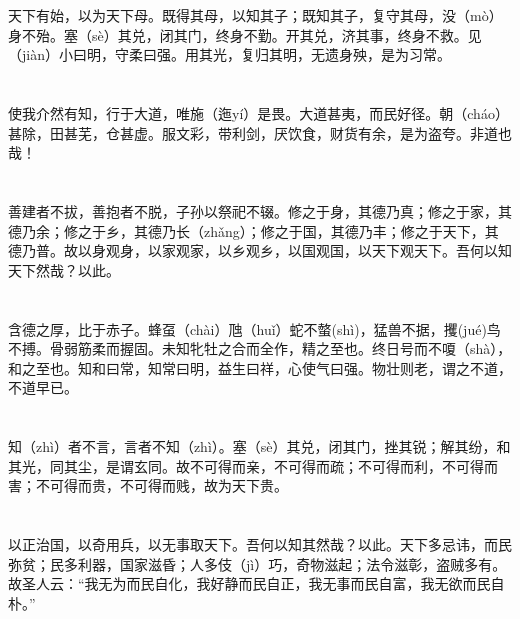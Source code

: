 \documentclass[a4paper,12pt,UTF8,twoside]{ctexbook}
\begin{document}
	天下有始，以为天下母。既得其母，以知其子；既知其子，复守其母，没（mò）身不殆。塞（sè）其兑，闭其门，终身不勤。开其兑，济其事，终身不救。见（jiàn）小曰明，守柔曰强。用其光，复归其明，无遗身殃，是为习常。
	
	\chapter{}	
	
	使我介然有知，行于大道，唯施（迤yí）是畏。大道甚夷，而民好径。朝（cháo）甚除，田甚芜，仓甚虚。服文彩，带利剑，厌饮食，财货有余，是为盗夸。非道也哉！
	
	\chapter{}	
	
	善建者不拔，善抱者不脱，子孙以祭祀不辍。修之于身，其德乃真；修之于家，其德乃余；修之于乡，其德乃长（zhǎng）；修之于国，其德乃丰；修之于天下，其德乃普。故以身观身，以家观家，以乡观乡，以国观国，以天下观天下。吾何以知天下然哉？以此。
	
	\chapter{}	
	
	含德之厚，比于赤子。蜂虿（chài）虺（huǐ）蛇不螫(shì)，猛兽不据，攫(jué)鸟不搏。骨弱筋柔而握固。未知牝牡之合而全作，精之至也。终日号而不嗄（shà），和之至也。知和曰常，知常曰明，益生曰祥，心使气曰强。物壮则老，谓之不道，不道早已。 
	
	\chapter{}	
	
	知（zhì）者不言，言者不知（zhì）。塞（sè）其兑，闭其门，挫其锐；解其纷，和其光，同其尘，是谓玄同。故不可得而亲，不可得而疏；不可得而利，不可得而害；不可得而贵，不可得而贱，故为天下贵。
	
	\chapter{}	
	
	以正治国，以奇用兵，以无事取天下。吾何以知其然哉？以此。天下多忌讳，而民弥贫；民多利器，国家滋昏；人多伎（jì）巧，奇物滋起；法令滋彰，盗贼多有。故圣人云：“我无为而民自化，我好静而民自正，我无事而民自富，我无欲而民自朴。”
	
	\chapter{}	
	
\end{document}
